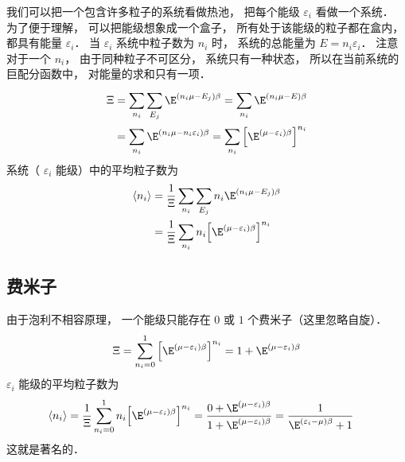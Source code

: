 
我们可以把一个包含许多粒子的系统看做热池， 把每个能级 ${\varepsilon _i}$ 看做一个系统． 为了便于理解， 可以把能级想象成一个盒子， 所有处于该能级的粒子都在盒内， 都具有能量 ${\varepsilon _i}$．  当 ${\varepsilon _i}$ 系统中粒子数为 ${n_i}$ 时， 系统的总能量为 $E = {n_i}{\varepsilon _i}$．  注意对于一个 ${n_i}$，  由于同种粒子不可区分， 系统只有一种状态， 所以在当前系统的巨配分函数中， 对能量的求和只有一项．
\begin{equation}
  \begin{aligned}
  \Xi & = \sum\limits_{{n_i}}^{} {\sum\limits_{{E_j}}^{} {{\E^{\left( {{n_i}\mu  - {E_j}} \right)\beta }}} }  = \sum\limits_{{n_i}}^{} {{\E^{\left( {{n_i}\mu  - E} \right)\beta }}}  \\
  & = \sum\limits_{{n_i}}^{} {{\E^{\left( {{n_i}\mu  - {n_i}{\varepsilon _i}} \right)\beta }}}  = \sum\limits_{{n_i}}^{} {{{\left[ {{\E^{\left( {\mu  - {\varepsilon _i}} \right)\beta }}} \right]}^{{n_i}}}}
  \end{aligned}
\end{equation}
系统（ ${\varepsilon _i}$ 能级）中的平均粒子数为
\begin{equation}
\begin{aligned}
  \left\langle {{n_i}} \right\rangle  & = \frac{1}{\Xi }\sum\limits_{{n_i}}^{} {\sum\limits_{{E_j}}^{} {{n_i}{\E^{\left( {{n_i}\mu  - {E_j}} \right)\beta }}} }  \\
  & = \frac{1}{\Xi }\sum\limits_{{n_i}}^{} {{n_i}{{\left[ {{\E^{\left( {\mu  - {\varepsilon _i}} \right)\beta }}} \right]}^{{n_i}}}}
\end{aligned}
\end{equation}
\subsection{费米子}
由于泡利不相容原理， 一个能级只能存在 $0$ 或 $1$ 个费米子（这里忽略自旋）．
\begin{equation}
  \Xi  = \sum\limits_{{n_i} = 0}^1 {{{\left[ {{\E^{\left( {\mu  - {\varepsilon _i}} \right)\beta }}} \right]}^{{n_i}}}}  = 1 + {\E^{\left( {\mu  - {\varepsilon _i}} \right)\beta }}
\end{equation}
 ${\varepsilon _i}$ 能级的平均粒子数为
\begin{equation}
\begin{aligned}
\left\langle {{n_i}} \right\rangle & = \frac{1}{\Xi }\sum\limits_{{n_i} = 0}^1 {{n_i}{{\left[ {{\E^{\left( {\mu  - {\varepsilon _i}} \right)\beta }}} \right]}^{{n_i}}}} = \frac{{0 + {\E^{\left( {\mu  - {\varepsilon _i}} \right)\beta }}}}{{1 + {\E^{\left( {\mu  - {\varepsilon _i}} \right)\beta }}}}  = \frac{1}{{{\E^{\left( {{\varepsilon _i} - \mu } \right)\beta }} + 1}}
\end{aligned}
\end{equation}
  这就是著名的．
